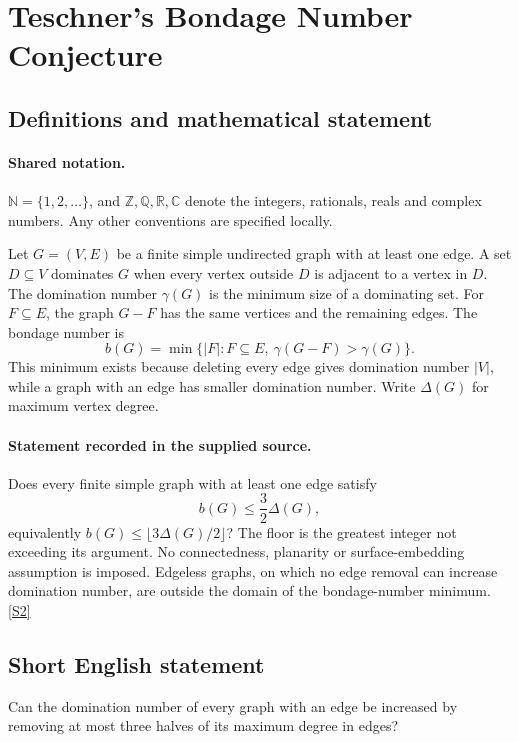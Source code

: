 \documentclass[11pt]{article}
\newcommand{\sref}[2]{\hyperlink{source:#1:#2}{[S#2]}}
\begin{document}
\section{Teschner's Bondage Number Conjecture}\label{statement}

\subsection{Definitions and mathematical statement}

\paragraph{Shared notation.}$\mathbb N=\{1,2,\ldots\}$, and $\mathbb Z,\mathbb Q,\mathbb R,\mathbb C$ denote the integers, rationals, reals and complex numbers. Any other conventions are specified locally.


Let $G=(V,E)$ be a finite simple undirected graph with at least one edge. A set $D\subseteq V$ dominates $G$ when every vertex outside $D$ is adjacent to a vertex in $D$. The domination number $\gamma(G)$ is the minimum size of a dominating set. For $F\subseteq E$, the graph $G-F$ has the same vertices and the remaining edges. The bondage number is
\[
 b(G)=\min\{|F|:F\subseteq E,\ \gamma(G-F)>\gamma(G)\}.
\]
This minimum exists because deleting every edge gives domination number $|V|$, while a graph with an edge has smaller domination number. Write $\Delta(G)$ for maximum vertex degree.
\paragraph{Statement recorded in the supplied source.}
Does every finite simple graph with at least one edge satisfy
\[
 b(G)\le\frac32\Delta(G),
\]
equivalently $b(G)\le\lfloor3\Delta(G)/2\rfloor$? The floor is the greatest integer not exceeding its argument. No connectedness, planarity or surface-embedding assumption is imposed. Edgeless graphs, on which no edge removal can increase domination number, are outside the domain of the bondage-number minimum. \sref{statement}{2}
\subsection{Short English statement}
Can the domination number of every graph with an edge be increased by removing at most three halves of its maximum degree in edges?
\end{document}
